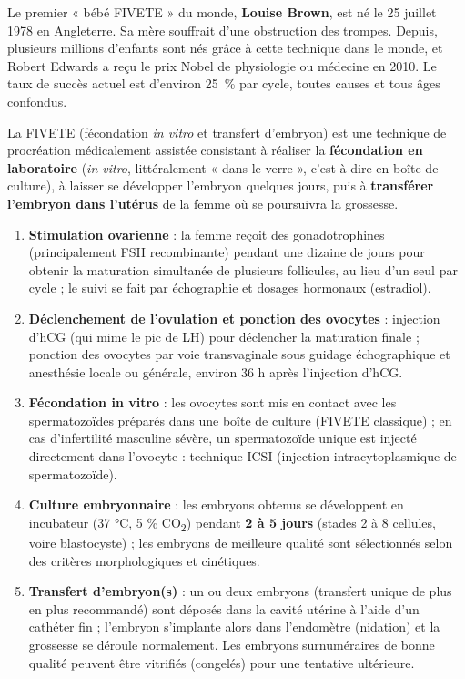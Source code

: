 \documentclass[11pt]{article}
\newcommand{\cle}[1]{{\popxbold\color{popdark}#1}}
\begin{document}
\begin{exemplebox}
Le premier « bébé FIVETE » du monde, \textbf{Louise Brown}, est né le 25 juillet 1978 en Angleterre. Sa mère souffrait d'une obstruction des trompes. Depuis, plusieurs millions d'enfants sont nés grâce à cette technique dans le monde, et Robert Edwards a reçu le prix Nobel de physiologie ou médecine en 2010. Le taux de succès actuel est d'environ \SI{25}{\percent} par cycle, toutes causes et tous âges confondus.
\end{exemplebox}

\begin{definition}[FIVETE]
La \cle{FIVETE} (fécondation \emph{in vitro} et transfert d'embryon) est une technique de procréation médicalement assistée consistant à réaliser la \textbf{fécondation en laboratoire} (\emph{in vitro}, littéralement « dans le verre », c'est-à-dire en boîte de culture), à laisser se développer l'embryon quelques jours, puis à \textbf{transférer l'embryon dans l'utérus} de la femme où se poursuivra la grossesse.
\end{definition}

\begin{methode}
\begin{enumerate}
\item \textbf{Stimulation ovarienne} : la femme reçoit des gonadotrophines (principalement FSH recombinante) pendant une dizaine de jours pour obtenir la maturation simultanée de plusieurs follicules, au lieu d'un seul par cycle ; le suivi se fait par échographie et dosages hormonaux (estradiol).
\item \textbf{Déclenchement de l'ovulation et ponction des ovocytes} : injection d'hCG (qui mime le pic de LH) pour déclencher la maturation finale ; ponction des ovocytes par voie transvaginale sous guidage échographique et anesthésie locale ou générale, environ 36 h après l'injection d'hCG.
\item \textbf{Fécondation in vitro} : les ovocytes sont mis en contact avec les spermatozoïdes préparés dans une boîte de culture (FIVETE classique) ; en cas d'infertilité masculine sévère, un spermatozoïde unique est injecté directement dans l'ovocyte : technique \cle{ICSI} (injection intracytoplasmique de spermatozoïde).
\item \textbf{Culture embryonnaire} : les embryons obtenus se développent en incubateur (37 °C, 5 \% CO\textsubscript{2}) pendant \textbf{2 à 5 jours} (stades 2 à 8 cellules, voire blastocyste) ; les embryons de meilleure qualité sont sélectionnés selon des critères morphologiques et cinétiques.
\item \textbf{Transfert d'embryon(s)} : un ou deux embryons (transfert unique de plus en plus recommandé) sont déposés dans la cavité utérine à l'aide d'un cathéter fin ; l'embryon s'implante alors dans l'endomètre (nidation) et la grossesse se déroule normalement. Les embryons surnuméraires de bonne qualité peuvent être vitrifiés (congelés) pour une tentative ultérieure.
\end{enumerate}
\end{methode}
\end{document}
